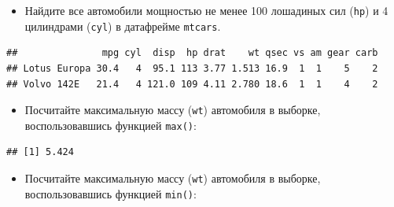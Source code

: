 \documentclass[]{book}
\newenvironment{Shaded}{\begin{snugshade}}{\end{snugshade}}
\newcommand{\KeywordTok}[1]{\textcolor[rgb]{0.13,0.29,0.53}{\textbf{#1}}}
\newcommand{\DecValTok}[1]{\textcolor[rgb]{0.00,0.00,0.81}{#1}}
\newcommand{\StringTok}[1]{\textcolor[rgb]{0.31,0.60,0.02}{#1}}
\newcommand{\OperatorTok}[1]{\textcolor[rgb]{0.81,0.36,0.00}{\textbf{#1}}}
\newcommand{\NormalTok}[1]{#1}
\providecommand{\tightlist}{%
  \setlength{\itemsep}{0pt}\setlength{\parskip}{0pt}}
\begin{document}
\begin{itemize}
\tightlist
\item
  Найдите все автомобили мощностью не менее 100 лошадиных сил
  (\texttt{hp}) и 4 цилиндрами (\texttt{cyl}) в датафрейме
  \texttt{mtcars}.
\end{itemize}

\begin{Shaded}
\end{Shaded}

\begin{verbatim}
##               mpg cyl  disp  hp drat    wt qsec vs am gear carb
## Lotus Europa 30.4   4  95.1 113 3.77 1.513 16.9  1  1    5    2
## Volvo 142E   21.4   4 121.0 109 4.11 2.780 18.6  1  1    4    2
\end{verbatim}

\begin{itemize}
\tightlist
\item
  Посчитайте максимальную массу (\texttt{wt}) автомобиля в выборке,
  воспользовавшись функцией \texttt{max()}:
\end{itemize}

\begin{Shaded}
\end{Shaded}

\begin{verbatim}
## [1] 5.424
\end{verbatim}

\begin{itemize}
\tightlist
\item
  Посчитайте максимальную массу (\texttt{wt}) автомобиля в выборке,
  воспользовавшись функцией \texttt{min()}:
\end{itemize}

\begin{Shaded}
\end{Shaded}
\end{document}
